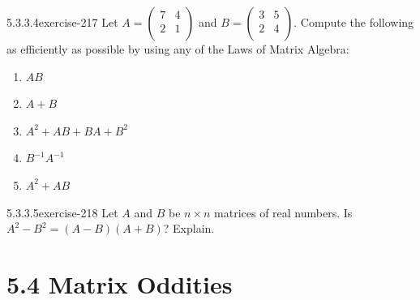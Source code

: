 \documentclass[twoside,10pt,]{book}
\numberwithin{equation}{section}
\begin{document}
\begin{divisionsolution}{5.3.3.4}{}{exercise-217}%
\hypertarget{p-1878}{}%
Let \(A =\left(
\begin{array}{cc}
7 & 4 \\
2 & 1 \\
\end{array}
\right)\) and \(B =\left(
\begin{array}{cc}
3 & 5 \\
2 & 4 \\
\end{array}
\right)\). Compute the following as efficiently as possible by using any of the Laws of Matrix Algebra:%
\par
\hypertarget{p-1879}{}%
\leavevmode%
\begin{enumerate}[label=(\alph*)]
\item\hypertarget{li-1001}{}\hypertarget{p-1880}{}%
\(A B\)%
\item\hypertarget{li-1002}{}\hypertarget{p-1881}{}%
\(A + B\)%
\item\hypertarget{li-1003}{}\hypertarget{p-1882}{}%
\(A^2 + A B + B A + B ^2\)%
\item\hypertarget{li-1004}{}\hypertarget{p-1883}{}%
\(B^{-1}A^{-1}\)%
\item\hypertarget{li-1005}{}\hypertarget{p-1884}{}%
\(A^2 + A B\)%
\end{enumerate}
%
\end{divisionsolution}%
\begin{divisionsolution}{5.3.3.5}{}{exercise-218}%
\hypertarget{p-1885}{}%
Let \(A\) and \(B\) be \(n\times n\) matrices of real numbers. Is \(A^2-B^2= (A-B)(A+B)\)?  Explain.%
\end{divisionsolution}%
\section*{5.4 Matrix Oddities}
\end{document}

